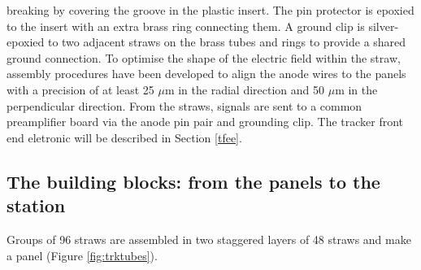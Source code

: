         breaking by covering the groove in the plastic insert. 
        The pin protector is epoxied to the insert with an extra 
        brass ring connecting them. A ground clip is silver-epoxied 
        to two adjacent straws on the brass tubes and rings to 
        provide a shared ground connection.
        To optimise the shape of the electric field within 
        the straw, assembly procedures have been developed 
        to align the anode wires to the panels with a 
        precision of at least 25 $\mu$m in the radial direction and 50 $\mu$m in the perpendicular direction. 
From the straws, signals are sent to a common preamplifier board 
via the anode pin pair and grounding clip. The tracker front 
end eletronic will be described in Section \ref{tfee}.
\subsection{The building blocks: from the panels to the station}
Groups of 96 straws are assembled in two staggered layers of 48 straws and make a 
panel (Figure \ref{fig:trktubes}). 

